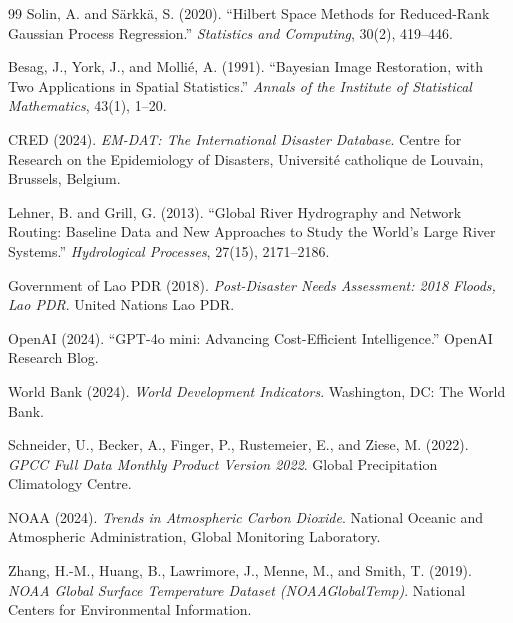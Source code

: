 \documentclass[11pt,a4paper]{article}
\begin{document}
\begin{thebibliography}{99}
Solin, A. and S\"{a}rkk\"{a}, S. (2020).
``Hilbert Space Methods for Reduced-Rank Gaussian Process Regression.''
\textit{Statistics and Computing}, 30(2), 419--446.

Besag, J., York, J., and Molli\'{e}, A. (1991).
``Bayesian Image Restoration, with Two Applications in Spatial Statistics.''
\textit{Annals of the Institute of Statistical Mathematics}, 43(1), 1--20.

CRED (2024).
\textit{EM-DAT: The International Disaster Database}.
Centre for Research on the Epidemiology of Disasters, Universit\'{e} catholique de Louvain, Brussels, Belgium.

Lehner, B. and Grill, G. (2013).
``Global River Hydrography and Network Routing: Baseline Data and New Approaches to Study the World's Large River Systems.''
\textit{Hydrological Processes}, 27(15), 2171--2186.

Government of Lao PDR (2018).
\textit{Post-Disaster Needs Assessment: 2018 Floods, Lao PDR}.
United Nations Lao PDR.

OpenAI (2024).
``GPT-4o mini: Advancing Cost-Efficient Intelligence.''
OpenAI Research Blog.

World Bank (2024).
\textit{World Development Indicators}.
Washington, DC: The World Bank.

Schneider, U., Becker, A., Finger, P., Rustemeier, E., and Ziese, M. (2022).
\textit{GPCC Full Data Monthly Product Version 2022}.
Global Precipitation Climatology Centre.

NOAA (2024).
\textit{Trends in Atmospheric Carbon Dioxide}.
National Oceanic and Atmospheric Administration, Global Monitoring Laboratory.

Zhang, H.-M., Huang, B., Lawrimore, J., Menne, M., and Smith, T. (2019).
\textit{NOAA Global Surface Temperature Dataset (NOAAGlobalTemp)}.
National Centers for Environmental Information.

\end{thebibliography}
\end{document}
